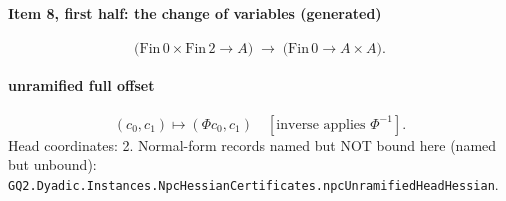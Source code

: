 \paragraph{Item 8, first half: the change of variables (generated)}
\[\bigl(\mathrm{Fin}\,0\times\mathrm{Fin}\,2\to A\bigr)\;\longrightarrow\;\bigl(\mathrm{Fin}\,0\to A\times A\bigr).\]
\paragraph{unramified full offset}
\[(c_0,c_1)\mapsto(\Phi c_0,c_1)\quad[\text{inverse applies }\Phi^{-1}].\]
Head coordinates: 2. Normal-form records named but NOT bound here (named but unbound): \texttt{GQ2.Dyadic.Instances.NpcHessianCertificates.npcUnramifiedHeadHessian}.
